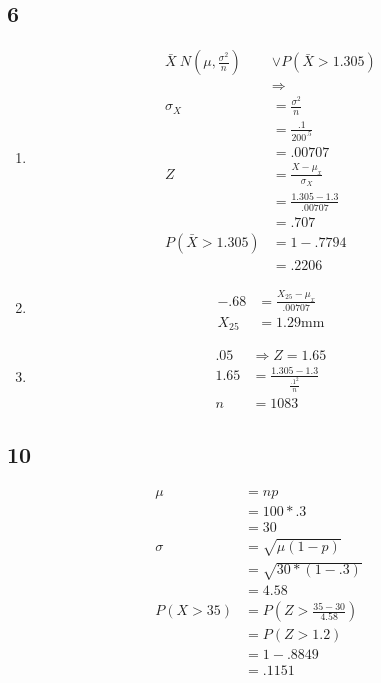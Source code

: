 \documentclass[12pt]{report}
\begin{document}
   \subsection*{6}
   \begin{enumerate}[label={\bf \alph*}]
   \item
   \begin{align*}
    \bar{X}~N(\mu,\frac{\sigma^2}{n}) &\vee P(\bar{X}>1.305)\\
                                      &\Rightarrow\\
                              \sigma_X&=\frac{\sigma^2}{n}\\
                                      &=\frac{.1}{200^.5}\\
                                      &=.00707\\
                                     Z&=\frac{X-\mu_x}{\sigma_X}\\
                                      &=\frac{1.305-1.3}{.00707}\\
                                      &=.707\\
                      P(\bar{X}>1.305)&=  1-.7794\\
                                      &= .2206
   \end{align*}
   \item
   \begin{align*}
         -.68&=\frac{X_{25}-\mu_x}{.00707}\\
       X_{25}&= 1.29 \text{mm}
   \end{align*}
   \item
   \begin{align*}
      .05 &\Rightarrow Z=1.65\\
      1.65&=\frac{1.305-1.3}{\frac{.1^2}{n}}\\
          n &= 1083
   \end{align*}
   \end{enumerate}
   \subsection*{10}
      \begin{align*}
          \mu&=np\\
             &=100*.3\\
             &=30\\
       \sigma&=\sqrt{\mu(1-p)}\\
             &=\sqrt{30*(1-.3)}\\
             &=4.58\\
      P(X>35)&=P(Z>\frac{35-30}{4.58})\\
             &=P(Z>1.2)\\
             &=1-.8849\\
             &=.1151
      \end{align*}
\end{document}
